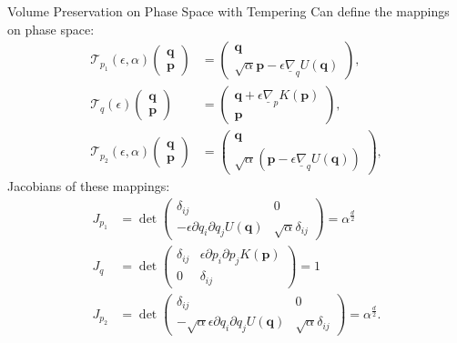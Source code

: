 \documentclass{beamer}
\begin{document}
\begin{frame}[t,allowframebreaks]{Volume Preservation on Phase Space with Tempering}
Can define the mappings on phase space:
\begin{align*}
        \mathcal{T}_{p_1}\left(\epsilon,\alpha\right)\begin{pmatrix} \bm{q} \\ \bm{p} \end{pmatrix} & = \begin{pmatrix} \bm{q} \\ \sqrt{\alpha}\bm{p} - \epsilon \underline{\nabla}_{q}U\left(\bm{q}\right)\end{pmatrix},\\
        \mathcal{T}_{q}\left(\epsilon\right)\begin{pmatrix} \bm{q} \\ \bm{p} \end{pmatrix} & = \begin{pmatrix} \bm{q} + \epsilon \underline{\nabla}_pK\left(\bm{p}\right)  \\ \bm{p} \end{pmatrix},\\
        \mathcal{T}_{p_2}\left(\epsilon,\alpha\right)\begin{pmatrix} \bm{q} \\ \bm{p} \end{pmatrix} & = \begin{pmatrix} \bm{q} \\ \sqrt{\alpha}\left(\bm{p} - \epsilon \underline{\nabla}_qU\left(\bm{q}\right)\right)\end{pmatrix},
    \end{align*}
Jacobians of these mappings:
\begin{align*}
        J_{p_1} & = \det\begin{pmatrix} \delta_{ij} & 0 \\ -\epsilon\partial q_i \partial q_j U\left(\bm{q}\right) & \sqrt{\alpha}\delta_{ij} \end{pmatrix} = \alpha^\frac{d}{2} \\
        J_{q} & = \det\begin{pmatrix} \delta_{ij} & \epsilon\partial p_i \partial p_j K\left(\bm{p}\right) \\ 0 & \delta_{ij} \end{pmatrix} = 1 \\
        J_{p_2} & = \det\begin{pmatrix} \delta_{ij} & 0 \\ -\sqrt{\alpha}\epsilon\partial q_i \partial q_j U\left(\bm{q}\right) & \sqrt{\alpha}\delta_{ij} \end{pmatrix} = \alpha^\frac{d}{2}.
    \end{align*}


\end{frame}
\end{document}
